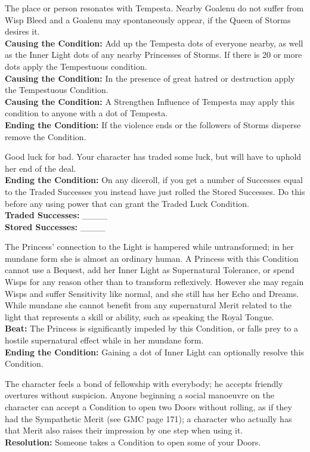 \documentclass[10pt, frontgrid, backgrid]{flacards}
\begin{document}
{The place or person resonates with Tempesta. Nearby Goalenu do not suffer from Wisp Bleed and a Goalenu may spontaneously appear, if the Queen of Storms desires it. \\

\textbf{Causing the Condition:} Add up the Tempesta dots of everyone nearby, as well as the Inner Light dots of any nearby Princesses of Storms. If there is 20 or more dots apply the Tempestuous condition. \\
\textbf{Causing the Condition:} In the presence of great hatred or destruction apply the Tempestuous Condition.\\
\textbf{Causing the Condition:} A Strengthen Influence of Tempesta may apply this condition to anyone with a dot of Tempesta. \\
\textbf{Ending the Condition:} If the violence ends or the followers of Storms disperse remove the Condition.}

{Good luck for bad. Your character has traded some luck, but will have to uphold her end of the deal. \\
\textbf{Ending the Condition:} On any diceroll, if you get a number of Successes equal to the Traded Successes you instead have just rolled the Stored Successes. Do this before any using power that can grant the Traded Luck Condition.\\
\textbf{Traded Successes:} \_\_\_\_\\
\textbf{Stored Successes:} \_\_\_\_}

{
The Princess' connection to the Light is hampered while untransformed; in her mundane form she is almost an ordinary human. A Princess with this Condition cannot use a Bequest, add her Inner Light as Supernatural Tolerance, or spend Wisps for any reason other than to transform reflexively. However she may regain Wisps and suffer Sensitivity like normal, and she still has her Echo and Dreams. While mundane she cannot benefit from any supernatural Merit related to the light that represents a skill or ability, such as speaking the Royal Tongue. \\
\textbf{Beat:} The Princess is significantly impeded by this Condition, or falls prey to a hostile supernatural effect while in her mundane form.\\
\textbf{Ending the Condition:} Gaining a dot of Inner Light can optionally resolve this Condition.
}

{The character feels a bond of fellowship with everybody; he accepts friendly overtures without suspicion. Anyone beginning a social manoeuvre on the character can accept a Condition to open two Doors without rolling, as if they had the Sympathetic Merit (see GMC page 171); a character who actually has that Merit also raises their impression by one step when using it.\\
\textbf{Resolution:} Someone takes a Condition to open some of your Doors. 
}
\end{document}
